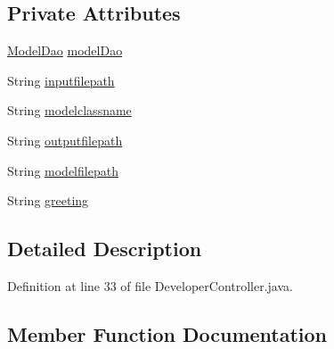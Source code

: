 \subsection*{Private Attributes}
\begin{DoxyCompactItemize}
\item 
\hyperlink{interfaceorg_1_1jboss_1_1as_1_1quickstarts_1_1greeter_1_1domain_1_1_model_dao}{Model\+Dao} \hyperlink{classorg_1_1jboss_1_1as_1_1quickstarts_1_1greeter_1_1web_1_1_developer_controller_a16bbc88f807eba18aea0d42b8c263c8f}{model\+Dao}
\item 
String \hyperlink{classorg_1_1jboss_1_1as_1_1quickstarts_1_1greeter_1_1web_1_1_developer_controller_a61bbf99553c38751a4db3723fcf86ce2}{inputfilepath}
\item 
String \hyperlink{classorg_1_1jboss_1_1as_1_1quickstarts_1_1greeter_1_1web_1_1_developer_controller_aec4dde64623318b1b021c6e3a88e496d}{modelclassname}
\item 
String \hyperlink{classorg_1_1jboss_1_1as_1_1quickstarts_1_1greeter_1_1web_1_1_developer_controller_a3e0376c736576915aa56e9a171393d35}{outputfilepath}
\item 
String \hyperlink{classorg_1_1jboss_1_1as_1_1quickstarts_1_1greeter_1_1web_1_1_developer_controller_a7217d97e73528f36dd074101cc6212f7}{modelfilepath}
\item 
String \hyperlink{classorg_1_1jboss_1_1as_1_1quickstarts_1_1greeter_1_1web_1_1_developer_controller_ab3a4eb4f08723b09bba21032d9183c01}{greeting}
\end{DoxyCompactItemize}


\subsection{Detailed Description}


Definition at line 33 of file Developer\+Controller.\+java.



\subsection{Member Function Documentation}
\mbox{\label{classorg_1_1jboss_1_1as_1_1quickstarts_1_1greeter_1_1web_1_1_developer_controller_a0204f7d1b8c5a8f0fa68270bd84c7c0c}} 
